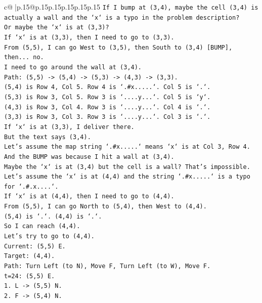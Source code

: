 \documentclass{article}
\begin{document}
{\begin{supertabular}{c@{$\;$}|p{.15\linewidth}@{}p{.15\linewidth}p{.15\linewidth}p{.15\linewidth}p{.15\linewidth}p{.15\linewidth}}
{{{\texttt{If I bump at (3,4), maybe the cell (3,4) is actually a wall and the `x` is a typo in the problem description?} \\
\texttt{Or maybe the `x` is at (3,3)?} \\
\texttt{If `x` is at (3,3), then I need to go to (3,3).} \\
\texttt{From (5,5), I can go West to (3,5), then South to (3,4) {[}BUMP{]}, then... no.} \\
\texttt{I need to go around the wall at (3,4).} \\
\texttt{Path: (5,5) {-}> (5,4) {-}> (5,3) {-}> (4,3) {-}> (3,3).} \\
\texttt{(5,4) is Row 4, Col 5. Row 4 is `.\#x.....`. Col 5 is `.`.} \\
\texttt{(5,3) is Row 3, Col 5. Row 3 is `....y...`. Col 5 is `y`.} \\
\texttt{(4,3) is Row 3, Col 4. Row 3 is `....y...`. Col 4 is `.`.} \\
\texttt{(3,3) is Row 3, Col 3. Row 3 is `....y...`. Col 3 is `.`.} \\
\texttt{If `x` is at (3,3), I deliver there.} \\
\texttt{But the text says (3,4).} \\
\texttt{Let's assume the map string `.\#x.....` means `x` is at Col 3, Row 4.} \\
\texttt{And the BUMP was because I hit a wall at (3,4).} \\
\texttt{Maybe the `x` is at (3,4) but the cell is a wall? That's impossible.} \\
\texttt{Let's assume the `x` is at (4,4) and the string `.\#x.....` is a typo for `.\#.x....`.} \\
\texttt{If `x` is at (4,4), then I need to go to (4,4).} \\
\texttt{From (5,5), I can go North to (5,4), then West to (4,4).} \\
\texttt{(5,4) is `.`. (4,4) is `.`.} \\
\texttt{So I can reach (4,4).} \\
\texttt{Let's try to go to (4,4).} \\
\texttt{Current: (5,5) E.} \\
\texttt{Target: (4,4).} \\
\texttt{Path: Turn Left (to N), Move F, Turn Left (to W), Move F.} \\
\texttt{t=24: (5,5) E.} \\
\texttt{1. L {-}> (5,5) N.} \\
\texttt{2. F {-}> (5,4) N.} \\
}}}
\end{supertabular}}
\end{document}
